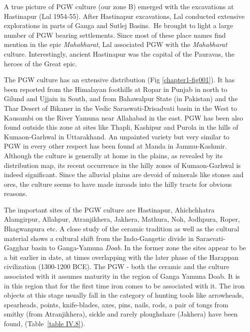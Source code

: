 A true picture of PGW culture (our zone B) emerged with the excavations at Hastinapur (Lal 1954-55). After Hastinapur excavations, Lal conducted extensive explorations in parts of Ganga and Sutlej Basins.~He brought to light a large number of PGW bearing settlements. Since most of these place names find mention in the epic \textit{Mahabharat}, Lal associated PGW with the \textit{Mahabharat} culture. Interestingly, ancient Hastinapur was the capital of the Pauravas, the heroes of the Great epic. 

The PGW culture has an extensive distribution (Fig \ref{chapter1-fig001}). It has been reported from the Himalayan foothills at Ropar in Punjab in north to Gilund and Ujjain in South, and from Bahawalpur State (in Pakistan) and the Thar Desert of Bikaner in the Vedic Saraswati-Drisadvati basin in the West to Kausambi on the River Yamuna near Allahabad in the east. PGW has been also found outside this zone at sites like Thapli, Kashipur and Purola in the hills of Kumaon-Garhwal in Uttarakhand. An unpainted variety but very similar to PGW in every other respect has been found at Manda in Jammu-Kashmir. Although the culture is generally at home in the plains, as revealed by its distribution map, its recent occurrence in the hilly zones of Kumaon-Garhwal is indeed significant. Since the alluvial plains are devoid of minerals like stones and ores, the culture seems to have made inroads into the hilly tracts for obvious reasons.

The important sites of the PGW culture are Hastinapur, Ahichchhatra Alamgirpur, Allahpur, Atranjikhera, Jakhera, Mathura, Noh, Jodhpura, Roper, Bhagwanpura etc. A close study of the ceramic tradition as well as the cultural material shows a cultural shift from the Indo-Gangetic divide in Sarasvati-Gagghar basin to Ganga-Yamuna \textit{Doab}. In the former zone the sites appear to be a bit earlier in date, at times overlapping with the later phase of the Harappan civilization (1300-1200 BCE). The PGW - both the ceramic and the culture associated with it assumes maturity in the region of Ganga Yamuna Doab. It is in this region that for the first time iron comes to be associated with it.  The iron objects at this stage usually fall in the category of hunting tools like arrowheads, spearheads, points, knife-blades, axes, pins, nails, rods, a pair of tongs from smithy (from Atranjikhera), sickle and rarely ploughshare (Jakhera) have been found, (Table~\ref{table IV.8}). 

